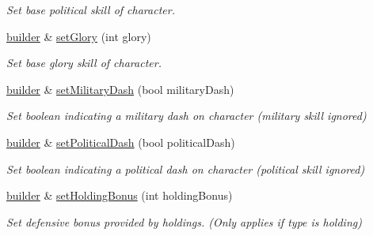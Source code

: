 \begin{DoxyCompactItemize}
\begin{DoxyCompactList}\small\item\em Set base political skill of character. \end{DoxyCompactList}\item 
\mbox{\label{classl5r_1_1CardData_1_1builder_a08cf301e285f6abd40937e785558fd30}} 
\hyperlink{classl5r_1_1CardData_1_1builder}{builder} \& \hyperlink{classl5r_1_1CardData_1_1builder_a08cf301e285f6abd40937e785558fd30}{set\+Glory} (int glory)
\begin{DoxyCompactList}\small\item\em Set base glory skill of character. \end{DoxyCompactList}\item 
\mbox{\label{classl5r_1_1CardData_1_1builder_a062e2acb3d64c588afb1523e9f4680b9}} 
\hyperlink{classl5r_1_1CardData_1_1builder}{builder} \& \hyperlink{classl5r_1_1CardData_1_1builder_a062e2acb3d64c588afb1523e9f4680b9}{set\+Military\+Dash} (bool military\+Dash)
\begin{DoxyCompactList}\small\item\em Set boolean indicating a military dash on character (military skill ignored) \end{DoxyCompactList}\item 
\mbox{\label{classl5r_1_1CardData_1_1builder_a1fb2b26023b9423a2ba2a48f11858db2}} 
\hyperlink{classl5r_1_1CardData_1_1builder}{builder} \& \hyperlink{classl5r_1_1CardData_1_1builder_a1fb2b26023b9423a2ba2a48f11858db2}{set\+Political\+Dash} (bool political\+Dash)
\begin{DoxyCompactList}\small\item\em Set boolean indicating a political dash on character (political skill ignored) \end{DoxyCompactList}\item 
\mbox{\label{classl5r_1_1CardData_1_1builder_affd14a9fbae9e43f1845093ff637c05b}} 
\hyperlink{classl5r_1_1CardData_1_1builder}{builder} \& \hyperlink{classl5r_1_1CardData_1_1builder_affd14a9fbae9e43f1845093ff637c05b}{set\+Holding\+Bonus} (int holding\+Bonus)
\begin{DoxyCompactList}\small\item\em Set defensive bonus provided by holdings. (Only applies if type is holding) \end{DoxyCompactList}\item 

\end{DoxyCompactItemize}
